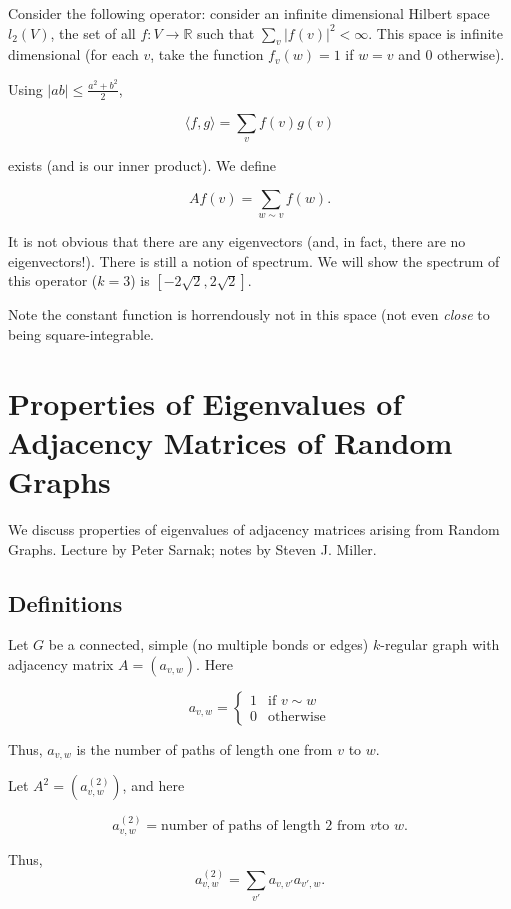 \documentclass[12pt,letterpaper]{report}
\newcommand\be{\begin{equation}}
\newcommand\ee{\end{equation}}
\newcommand{\R}{\ensuremath{\mathbb{R}}}
\newcommand{\twocase}[5]{#1 \begin{cases} #2 & \text{#3}\\ #4
&\text{#5} \end{cases}   }
\begin{document}
Consider the following operator: consider an infinite dimensional
Hilbert space $l_2(V)$, the set of all $f:V \rightarrow \R$ such
that $\sum_v |f(v)|^2 < \infty$. This space is infinite
dimensional (for each $v$, take the function $f_v(w) = 1$ if $w =
v$ and $0$ otherwise).

Using $|ab| \le \frac{a^2 + b^2}{2}$,

\be \langle f, g\rangle = \sum_v f(v)g(v) \ee

exists (and is our inner product). We define

\be Af(v) = \sum_{w \sim v} f(w). \ee

It is not obvious that there are any eigenvectors (and, in fact,
there are no eigenvectors!). There is still a notion of spectrum.
We will show the spectrum of this operator ($k = 3$) is
$[-2\sqrt{2},2\sqrt{2}]$.

Note the constant function is horrendously not in this space (not
even \emph{close} to being square-integrable.




\chapter{Properties of Eigenvalues of Adjacency Matrices of Random Graphs}

We discuss properties of eigenvalues of adjacency matrices arising
from Random Graphs. Lecture by Peter Sarnak; notes by Steven J.
Miller.

\section{Definitions}

Let $G$ be a connected, simple (no multiple bonds or edges)
$k$-regular graph with adjacency matrix $A = (a_{v,w})$. Here

\be \twocase{a_{v,w} =}{1}{if $v \sim w$}{0}{otherwise} \ee

Thus, $a_{v,w}$ is the number of paths of length one from $v$ to
$w$.

Let $A^2 = (a^{(2)}_{v,w})$, and here

\be a^{(2)}_{v,w} = \text{number of paths of length $2$ from $v$
to $w$}. \ee

Thus, \be a^{(2)}_{v,w} = \sum_{v'} a_{v,v'} a_{v',w}. \ee
\end{document}
